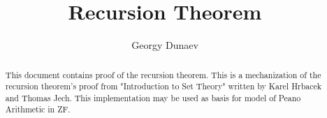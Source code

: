 \documentclass[11pt,a4paper]{article}
\begin{document}
\title{Recursion Theorem}
\author{Georgy Dunaev}
\maketitle

\begin{abstract}
  This document contains proof of the recursion theorem.
  This is a mechanization of the recursion theorem's proof from 
  "Introduction to Set Theory" written by Karel Hrbacek 
  and Thomas Jech. This implementation may be used as basis for 
  model of Peano Arithmetic in ZF.
\end{abstract}

\tableofcontents





\end{document}
